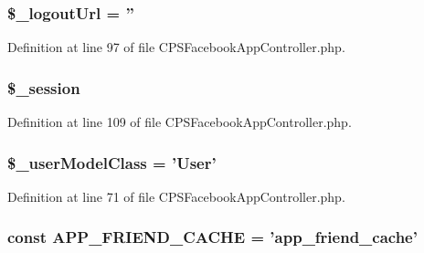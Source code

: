 \hypertarget{classCPSFacebookAppController_a51fb44c62c03238ce850844bb9835e9a}{
\subsubsection[{\$\_\-logoutUrl}]{\setlength{\rightskip}{0pt plus 5cm}\$\_\-logoutUrl = ''}}
\label{classCPSFacebookAppController_a51fb44c62c03238ce850844bb9835e9a}


Definition at line 97 of file CPSFacebookAppController.php.

\hypertarget{classCPSFacebookAppController_ad0641deaf4d314f034a134efaa6fbff0}{
\subsubsection[{\$\_\-session}]{\setlength{\rightskip}{0pt plus 5cm}\$\_\-session}}
\label{classCPSFacebookAppController_ad0641deaf4d314f034a134efaa6fbff0}


Definition at line 109 of file CPSFacebookAppController.php.

\hypertarget{classCPSFacebookAppController_a86b918c4cc90bae631b0f42b136d3a3c}{
\subsubsection[{\$\_\-userModelClass}]{\setlength{\rightskip}{0pt plus 5cm}\$\_\-userModelClass = 'User'}}
\label{classCPSFacebookAppController_a86b918c4cc90bae631b0f42b136d3a3c}


Definition at line 71 of file CPSFacebookAppController.php.

\hypertarget{classCPSFacebookAppController_a1893848deeea686e915dd2151301e807}{
\subsubsection[{APP\_\-FRIEND\_\-CACHE}]{\setlength{\rightskip}{0pt plus 5cm}const {\bf APP\_\-FRIEND\_\-CACHE} = 'app\_\-friend\_\-cache'}}
\label{classCPSFacebookAppController_a1893848deeea686e915dd2151301e807}


